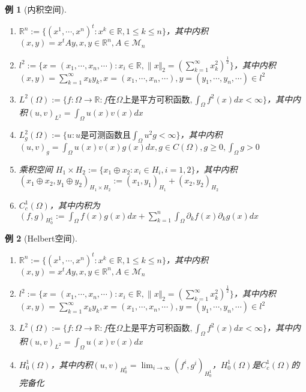 \documentclass{article}                     %
\numberwithin{equation}{section}            %
\numberwithin{figure}{section}              %
\numberwithin{table}{section}               %
\newtheorem{example}{\indent 例}[section]
\begin{document}
\begin{example}[内积空间]
    \begin{enumerate}
        \item $\mathbb{R} ^n:=\{(x^1,\cdots,x^n)^t:x^k\in \mathbb{R},1\le k\le n\}$，其中内积$(x,y)=x^tAy,x,y\in \mathbb{R} ^n,A\in \mathcal{M} _n$
        \item $l^2:=\{x=(x_1,\cdots,x_n,\cdots):x_i\in \mathbb{R},\| x\Vert _2=(\sum_{k=1}^{\infty}x_k^2)^{\frac{1}{2}}\}$，其中内积$(x,y)=\sum_{k=1}^{\infty}x_ky_k,x=(x_1,\cdots,x_n,\cdots),y=(y_1,\cdots,y_n,\cdots)\in l^2$
        \item $L^2(\Omega ):=\{f:\Omega\to \mathbb{R}:f\mbox{在}\Omega\mbox{上是平方可积函数},\int_{\Omega}f^2(x)dx<\infty\}$，其中内积$(u,v)_{L^2}=\int_{\Omega}u(x)v(x)dx$
        \item $L_g^2(\Omega):=\{u:u\mbox{是可测函数且}\int_{\Omega}u^2g<\infty\}$，其中内积$(u,v)_{g}=\int_{\Omega}u(x)v(x)g(x)dx,g\in C(\Omega),g\ge 0,\int_{\Omega}g>0$
        \item 乘积空间 $H_1\times H_2:=\{x_1\oplus x_2:x_i\in H_i,i=1,2\}$，其中内积$(x_1\oplus x_2,y_1\oplus y_2)_{H_1\times H_2}:=(x_1,y_1)_{H_1}+(x_2,y_2)_{H_2}$
        \item $C_c^1(\Omega)$，其中内积为$(f,g)_{H_0^1}:=\int_{\Omega}f(x)g(x)dx+\sum_{k=1}^n\int_{\Omega}\partial_kf(x)\partial_kg(x)dx$
    \end{enumerate}
\end{example}

\begin{example}[Helbert空间]
    \begin{enumerate}
        \item $\mathbb{R} ^n:=\{(x^1,\cdots,x^n)^t:x^k\in \mathbb{R},1\le k\le n\}$，其中内积$(x,y)=x^tAy,x,y\in \mathbb{R} ^n,A\in \mathcal{M} _n$
        \item $l^2:=\{x=(x_1,\cdots,x_n,\cdots):x_i\in \mathbb{R},\| x\Vert _2=(\sum_{k=1}^{\infty}x_k^2)^{\frac{1}{2}}\}$，其中内积$(x,y)=\sum_{k=1}^{\infty}x_ky_k,x=(x_1,\cdots,x_n,\cdots),y=(y_1,\cdots,y_n,\cdots)\in l^2$
        \item $L^2(\Omega ):=\{f:\Omega\to \mathbb{R}:f\mbox{在}\Omega\mbox{上是平方可积函数},\int_{\Omega}f^2(x)dx<\infty\}$，其中内积$(u,v)_{L^2}=\int_{\Omega}u(x)v(x)dx$
        \item $H_0^1(\Omega)$，其中内积$(u,v)_{H_0^1}=\lim_{i\to \infty}(f^i,g^i)_{H_0^1}$，$H_0^1(\Omega)$是$C_c^1(\Omega)$的完备化
    \end{enumerate}
\end{example}
\end{document}
